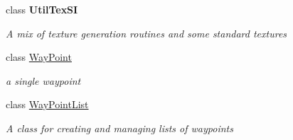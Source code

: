 \begin{DoxyCompactItemize}
class {\bfseries Util\+Tex\+SI}
\begin{DoxyCompactList}\small\item\em A mix of texture generation routines and some standard textures \end{DoxyCompactList}\item 
class \mbox{\hyperlink{class_r_c___framework_1_1_way_point}{Way\+Point}}
\begin{DoxyCompactList}\small\item\em a single waypoint \end{DoxyCompactList}\item 
class \mbox{\hyperlink{class_r_c___framework_1_1_way_point_list}{Way\+Point\+List}}
\begin{DoxyCompactList}\small\item\em A class for creating and managing lists of waypoints \end{DoxyCompactList}\end{DoxyCompactItemize}
